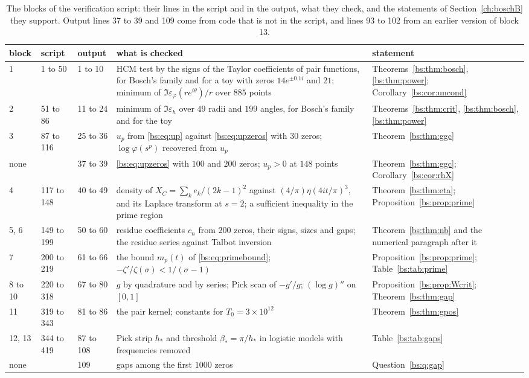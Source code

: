 \begin{table}[htbp]
\centering\footnotesize\setlength{\tabcolsep}{4pt}
\begin{tabular}{@{}lllp{}p{}@{}}
\toprule
block & script & output & what is checked & statement\\
\midrule
1 & 1 to 50 & 1 to 10 & \raggedright HCM test by the signs of the Taylor coefficients of pair functions, for Bosch's family and for a toy with zeros $14e^{\pm0.1i}$ and $21$; minimum of ${\Im\varepsilon_\varphi(re^{i\theta})/r}$ over $885$ points & \raggedright Theorems~\ref{bs:thm:bosch}, \ref{bs:thm:power}; Corollary~\ref{bs:cor:uncond}\tabularnewline
2 & 51 to 86 & 11 to 24 & \raggedright minimum of $\Im\varepsilon_h$ over $49$ radii and $199$ angles, for Bosch's family and for the toy & \raggedright Theorems~\ref{bs:thm:crit}, \ref{bs:thm:bosch}, \ref{bs:thm:power}\tabularnewline
3 & 87 to 116 & 25 to 36 & \raggedright $u_p$ from \eqref{bs:eq:up} against \eqref{bs:eq:upzeros} with $30$ zeros; $\log\varphi(s^p)$ recovered from $u_p$ & \raggedright Theorem~\ref{bs:thm:ggc}\tabularnewline
none &  & 37 to 39 & \raggedright \eqref{bs:eq:upzeros} with $100$ and $200$ zeros; $u_p>0$ at $148$ points & \raggedright Theorem~\ref{bs:thm:ggc}; Corollary~\ref{bs:cor:rhX}\tabularnewline
4 & 117 to 148 & 40 to 49 & \raggedright density of ${X_C=\sum_ke_k/(2k-1)^2}$ against $(4/\pi)\eta(4it/\pi)^3$, and its Laplace transform at $s=2$; a sufficient inequality in the prime region & \raggedright Theorem~\ref{bs:thm:eta}; Proposition~\ref{bs:prop:prime}\tabularnewline
5, 6 & 149 to 199 & 50 to 60 & \raggedright residue coefficients $c_n$ from $200$ zeros, their signs, sizes and gaps; the residue series against Talbot inversion & \raggedright Theorem~\ref{bs:thm:nb} and the numerical paragraph after it\tabularnewline
7 & 200 to 219 & 61 to 66 & \raggedright the bound $m_p(t)$ of \eqref{bs:eq:primebound}; ${-\zeta'/\zeta(\sigma)<1/(\sigma-1)}$ & \raggedright Proposition~\ref{bs:prop:prime}; Table~\ref{bs:tab:prime}\tabularnewline
8 to 10 & 220 to 318 & 67 to 80 & \raggedright $g$ by quadrature and by series; Pick scan of $-g'/g$; $(\log g)''$ on $[0,1]$ & \raggedright Proposition~\ref{bs:prop:Wcrit}; Theorem~\ref{bs:thm:gap}\tabularnewline
11 & 319 to 343 & 81 to 86 & \raggedright the pair kernel; constants for ${T_0=3\times10^{12}}$ & \raggedright Theorem~\ref{bs:thm:gpos}\tabularnewline
12, 13 & 344 to 419 & 87 to 108 & \raggedright Pick strip $h_*$ and threshold $\beta_*=\pi/h_*$ in logistic models with frequencies removed & \raggedright Table~\ref{bs:tab:gaps}\tabularnewline
none &  & 109 & \raggedright gaps among the first $1000$ zeros & \raggedright Question~\ref{bs:q:gap}\tabularnewline
\bottomrule
\end{tabular}
\caption{The blocks of the verification script: their lines in the script and in the output, what they check, and the statements of Section~\ref{ch:boschB} they support. Output lines 37 to 39 and 109 come from code that is not in the script, and lines 93 to 102 from an earlier version of block 13.}
\label{tab:app:bosch}
\end{table}

